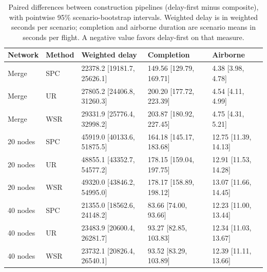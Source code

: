 \begin{table}[!htbp]
\caption{Paired differences between construction pipelines (delay-first minus composite), with pointwise 95\% scenario-bootstrap intervals. Weighted delay is in weighted seconds per scenario; completion and airborne duration are scenario means in seconds per flight. A negative value favors delay-first on that measure.}\label{tab:construction-cross-mode}
\centering\small
\begin{tabularx}{\textwidth}{l l L L L}
\toprule Network & Method & Weighted delay & Completion & Airborne\\\midrule
Merge & SPC & 22378.2 [19181.7, 25626.1] & 149.56 [129.79, 169.71] & 4.38 [3.98, 4.78]\\
Merge & UR & 27805.2 [24406.8, 31260.3] & 200.20 [177.72, 223.39] & 4.54 [4.11, 4.99]\\
Merge & WSR & 29331.9 [25776.4, 32998.2] & 203.87 [180.92, 227.45] & 4.75 [4.31, 5.21]\\
20 nodes & SPC & 45919.0 [40133.6, 51875.5] & 164.18 [145.17, 183.68] & 12.75 [11.39, 14.13]\\
20 nodes & UR & 48855.1 [43352.7, 54577.2] & 178.15 [159.04, 197.75] & 12.91 [11.53, 14.28]\\
20 nodes & WSR & 49320.0 [43846.2, 54995.0] & 178.17 [158.89, 198.12] & 13.07 [11.66, 14.45]\\
40 nodes & SPC & 21355.0 [18562.6, 24148.2] & 83.66 [74.00, 93.66] & 12.23 [11.00, 13.44]\\
40 nodes & UR & 23483.9 [20600.4, 26281.7] & 93.27 [82.85, 103.83] & 12.34 [11.03, 13.67]\\
40 nodes & WSR & 23732.1 [20826.4, 26540.1] & 93.52 [83.29, 103.89] & 12.39 [11.11, 13.66]\\
\bottomrule
\end{tabularx}
\end{table}
